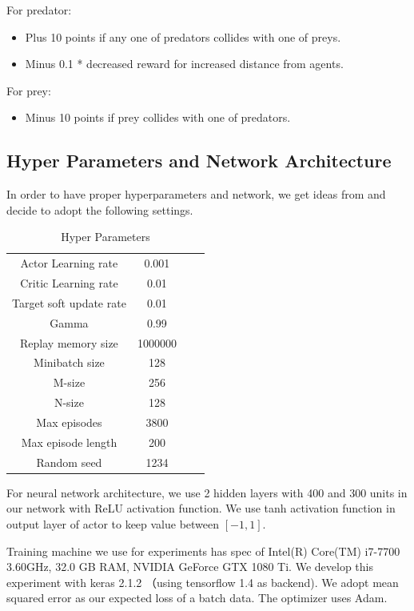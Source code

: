 \documentclass[11pt,twocolumn]{jarticle} %
\begin{document}
For predator:
\begin{itemize}
  \item Plus 10 points if any one of predators collides with one of preys.
  \item Minus 0.1 * decreased reward for increased distance from agents.
\end{itemize}
For prey:
\begin{itemize}
  \item Minus 10 points if prey collides with one of predators.
\end{itemize}

\subsection{Hyper Parameters and Network Architecture}
In order to have proper hyperparameters and network, we get ideas from\cite{param} and decide to adopt the following settings.

\begin{table}[ht]
 \caption{Hyper Parameters} 
 \label{tbl:hyperparameters}
  \begin{center}
    \begin{tabular}{c|ccc}
  \hline \hline
  Actor Learning rate  & 0.001   \\
  Critic Learning rate & 0.01    \\
  Target soft update rate & 0.01 \\
  Gamma                & 0.99    \\
  Replay memory size   & 1000000 \\
  Minibatch size       & 128     \\
  M-size               & 256     \\
  N-size               & 128     \\
  Max episodes         & 3800   \\
  Max episode length   & 200     \\
  Random seed          & 1234    \\\hline
    \end{tabular}
  \end{center}
\end{table}

For neural network architecture, we use 2 hidden layers with 400 and 300 units in our network with ReLU activation function. We use tanh activation function in output layer of actor to keep value between $[-1, 1]$. 

Training machine we use for experiments has spec of Intel(R) Core(TM) i7-7700 3.60GHz, 32.0 GB RAM, NVIDIA GeForce GTX 1080 Ti. We develop this experiment with keras 2.1.2 （using tensorflow 1.4 as backend). We adopt mean squared error as our expected loss of a batch data. The optimizer uses Adam\cite{adam}.\par
\end{document}
